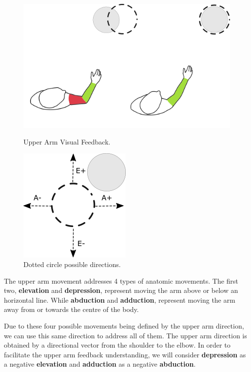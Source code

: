 \begin{figure}[!t]
  \centering
  \includegraphics[width=0.8\linewidth]{imgs/approach/upperarmfeedback}
   \caption{Upper Arm Visual Feedback.}
   \label{fig:upperarmfeedback}
    \endminipage\hfill
{}
  \centering
  \includegraphics[width=0.5\linewidth]{imgs/approach/upperarmcirclemovement}
    \caption{Dotted circle possible directions.}
    \label{fig:upperarmcirclemovement}
    \endminipage
    \end{figure}

The upper arm movement addresses 4 types of anatomic movements. 
The first two, \textbf{elevation} and \textbf{depression}, represent moving the arm above or below an horizontal line. 
While \textbf{abduction} and \textbf{adduction}, represent moving the arm away from or towards the centre of the body.

Due to these four possible movements being defined by the upper arm direction, we can use this same direction to address all of them. 
The upper arm direction is obtained by a directional vector from the shoulder to the elbow.
In order to facilitate the upper arm feedback understanding, we will consider \textbf{depression} as a negative \textbf{elevation} and \textbf{adduction} as a negative \textbf{abduction}.

